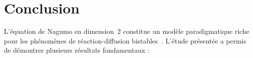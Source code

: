 \documentclass[11pt,a4paper]{report}
\begin{document}

\chapter*{Conclusion}

L'\'equation de Nagumo en dimension~2 constitue un mod\`ele paradigmatique riche pour
les ph\'enom\`enes de r\'eaction-diffusion bistables~\cite{Grindrod1988}.
L'\'etude pr\'esent\'ee a permis de d\'emontrer plusieurs r\'esultats fondamentaux :
\end{document}
